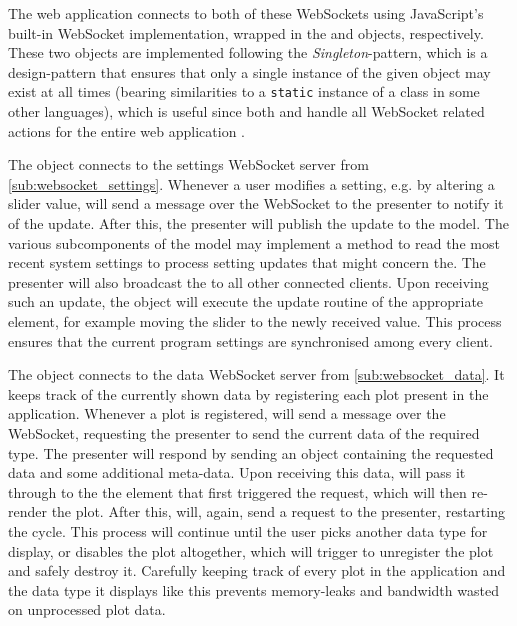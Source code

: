 \documentclass[a4paper, openany, oneside]{memoir}
\begin{document}
The web application connects to both of these WebSockets using JavaScript's built-in WebSocket implementation, wrapped in the  and  objects, respectively. These two objects are implemented following the \emph{Singleton}-pattern, which is a design-pattern that ensures that only a single instance of the given object may exist at all times (bearing similarities to a \texttt{static} instance of a class in some other languages), which is useful since both  and  handle all WebSocket related actions for the entire web application \cite[127]{designpatterns}.

The  object connects to the settings WebSocket server from \cref{sub:websocket_settings}. Whenever a user modifies a setting, e.g. by altering a slider value,  will send a message over the WebSocket to the presenter to notify it of the update.
After this, the presenter will publish the update to the model. The various subcomponents of the model may implement a method to read the most recent system settings to process setting updates that might concern the.
The presenter will also broadcast the to all other connected clients. Upon receiving such an update, the  object will execute the update routine of the appropriate element, for example moving the slider to the newly received value. This process ensures that the current program settings are synchronised among every client.

The  object connects to the data WebSocket server from \cref{sub:websocket_data}. It keeps track of the currently shown data by registering each plot present in the application. Whenever a plot is registered,  will send a message over the WebSocket, requesting the presenter to send the current data of the required type. The presenter will respond by sending an object containing the requested data and some additional meta-data. Upon receiving this data,  will pass it through to the the element that first triggered the request, which will then re-render the plot. After this,  will, again, send a request to the presenter, restarting the cycle. This process will continue until the user picks another data type for display, or disables the plot altogether, which will trigger  to unregister the plot and safely destroy it. Carefully keeping track of every plot in the application and the data type it displays like this prevents memory-leaks and bandwidth wasted on unprocessed plot data.
\end{document}
